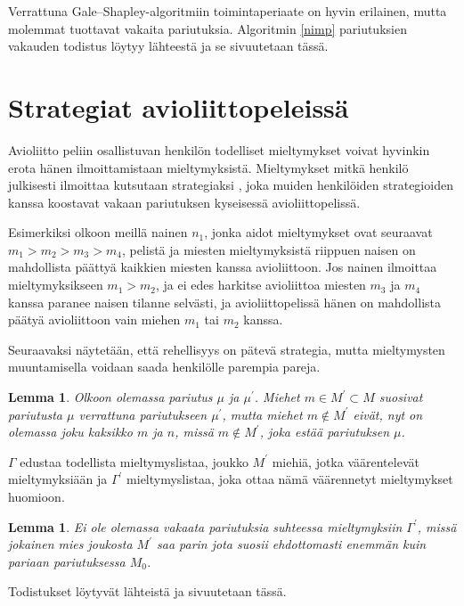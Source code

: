 \documentclass[finnish]{tktltiki2}
\newtheorem{lem}[lau]{Lemma}
\theoremstyle{definition}
\theoremstyle{remark}
\begin{document}
Verrattuna Gale--Shapley-algoritmiin toimintaperiaate on hyvin erilainen, mutta molemmat tuottavat vakaita pariutuksia. Algoritmin \ref{nimp} pariutuksien vakauden todistus löytyy lähteestä ja se sivuutetaan tässä.

\section{Strategiat avioliittopeleissä}
Avioliitto peliin osallistuvan henkilön todelliset mieltymykset voivat hyvinkin erota hänen ilmoittamistaan mieltymyksistä. Mieltymykset mitkä henkilö julkisesti ilmoittaa kutsutaan strategiaksi \cite[p, 592]{Balinski}, joka muiden henkilöiden strategioiden kanssa koostavat vakaan pariutuksen kyseisessä avioliittopelissä.

Esimerkiksi olkoon meillä nainen $n_1$, jonka aidot mieltymykset ovat seuraavat $m_1 > m_2 > m_3 > m_4$, pelistä ja miesten mieltymyksistä riippuen naisen on mahdollista päättyä kaikkien miesten kanssa avioliittoon. Jos nainen ilmoittaa mieltymyksikseen $m_1 > m_2$, ja ei edes harkitse avioliittoa miesten $m_3$ ja $m_4$ kanssa paranee naisen tilanne selvästi, ja avioliittopelissä hänen on mahdollista päätyä avioliittoon vain miehen $m_1$ tai $m_2$ kanssa.

Seuraavaksi näytetään, että rehellisyys on pätevä strategia, mutta mieltymysten muuntamisella voidaan saada henkilölle parempia pareja.

\begin{lem}\cite[p, 587]{Balinski}\label{bal-1}
	Olkoon olemassa pariutus $\mu$ ja $\mu^{'}$. Miehet $m \in M^{'} \subset M$ suosivat pariutusta $\mu$ verrattuna pariutukseen $\mu^{'}$, mutta miehet $m \notin M^{'}$ eivät, nyt on olemassa joku kaksikko $m$ ja $n$, missä $m \notin M^{'}$, joka estää pariutuksen $\mu$.
\end{lem}

$\Gamma$ edustaa todellista mieltymyslistaa, joukko $M^{'}$ miehiä, jotka väärentelevät mieltymyksiään ja $\Gamma^{'}$ mieltymyslistaa, joka ottaa nämä väärennetyt mieltymykset huomioon.

\begin{lem}\cite[p, 56]{gusfield1989stable}\label{strategy-gus}
	Ei ole olemassa vakaata pariutuksia suhteessa mieltymyksiin $\Gamma^{'}$, missä jokainen mies joukosta $M^{'}$ saa parin jota suosii ehdottomasti enemmän kuin pariaan pariutuksessa $M_0$.
\end{lem}

Todistukset löytyvät lähteistä ja sivuutetaan tässä.
\end{document}
